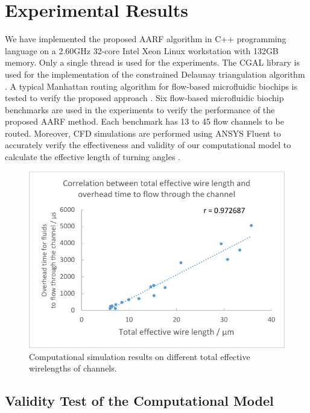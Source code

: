 \documentclass[journal]{IEEEtran}
\begin{document}
\section{Experimental Results}
\label{sec:exp}

We have implemented the proposed AARF algorithm in C++ programming language on a 2.60GHz 32-core Intel Xeon Linux workstation with 132GB memory. 
Only a single thread is used for the experiments. 
The CGAL library is used for the implementation of the constrained Delaunay triangulation algorithm \cite{cgal}. 
A typical Manhattan routing algorithm for flow-based microfluidic biochips is tested to verify the proposed approach \cite{Yao:2015}.
 Six flow-based microfluidic biochip benchmarks are used in the experiments to verify the performance of the proposed AARF method. 
 Each benchmark has 13 to 45 flow channels to be routed. 
 Moreover, CFD simulations are performed using ANSYS Fluent to accurately verify the effectiveness and validity of our computational model to calculate the effective length of turning angles \cite{fluent}.

\begin{figure}
	\label{fig:rlv}
	\centering
	\includegraphics[width=0.9\columnwidth, angle=0]{./Figs/relativity.pdf}
	\vspace{-0.2cm}
	\caption{Computational simulation results on different total effective wirelengths of channels.}
	\label{fig:rlv}
\end{figure}

\subsection{Validity Test of the Computational Model}
\end{document}
